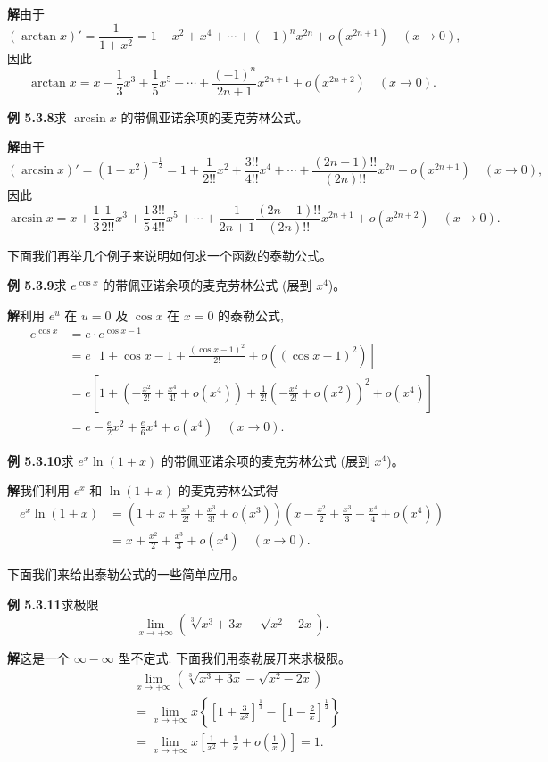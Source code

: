 \documentclass[UTF8, 12pt, fontset=fandol, oneside]{ctexart}
\begin{document}
\noindent\textbf{解}\quad 由于
\[
  (\arctan x)'=\frac1{1+x^2}=1-x^2+x^4+\cdots+(-1)^nx^{2n}+o(x^{2n+1})\quad (x\to0),
\]
因此
\[
  \arctan x=x-\frac13x^3+\frac15x^5+\cdots+\frac{(-1)^n}{2n+1}x^{2n+1}+o(x^{2n+2})\quad (x\to0).
\]

\noindent\textbf{例 5.3.8}\quad 求 $\arcsin x$ 的带佩亚诺余项的麦克劳林公式。

\noindent\textbf{解}\quad 由于
\[
  (\arcsin x)'=(1-x^2)^{-\frac12}
  =
  1+\frac1{2!!}x^2+\frac{3!!}{4!!}x^4+\cdots+
  \frac{(2n-1)!!}{(2n)!!}x^{2n}+o(x^{2n+1})
  \quad (x\to0),
\]
因此
\[
  \arcsin x
  =
  x+\frac13\frac1{2!!}x^3+\frac15\frac{3!!}{4!!}x^5+\cdots
  +\frac1{2n+1}\frac{(2n-1)!!}{(2n)!!}x^{2n+1}
  +o(x^{2n+2})
  \quad (x\to0).
\]

下面我们再举几个例子来说明如何求一个函数的泰勒公式。

\noindent\textbf{例 5.3.9}\quad 求 $e^{\cos x}$ 的带佩亚诺余项的麦克劳林公式 (展到 $x^4$)。

\noindent\textbf{解}\quad 利用 $e^u$ 在 $u=0$ 及 $\cos x$ 在 $x=0$ 的泰勒公式,
\[
\begin{aligned}
  e^{\cos x}
  &=
  e\cdot e^{\cos x-1} \\
  &=
  e\left[1+\cos x-1+\frac{(\cos x-1)^2}{2!}+o((\cos x-1)^2)\right] \\
  &=
  e\left[1+\left(-\frac{x^2}{2!}+\frac{x^4}{4!}+o(x^4)\right)
  +\frac1{2!}\left(-\frac{x^2}{2!}+o(x^2)\right)^2+o(x^4)\right] \\
  &=
  e-\frac e2x^2+\frac e6x^4+o(x^4)\quad (x\to0).
\end{aligned}
\]

\noindent\textbf{例 5.3.10}\quad 求 $e^x\ln(1+x)$ 的带佩亚诺余项的麦克劳林公式 (展到 $x^4$)。

\noindent\textbf{解}\quad 我们利用 $e^x$ 和 $\ln(1+x)$ 的麦克劳林公式得
\[
\begin{aligned}
  e^x\ln(1+x)
  &=
  \left(1+x+\frac{x^2}{2!}+\frac{x^3}{3!}+o(x^3)\right)
  \left(x-\frac{x^2}{2}+\frac{x^3}{3}-\frac{x^4}{4}+o(x^4)\right) \\
  &=
  x+\frac{x^2}{2}+\frac{x^3}{3}+o(x^4)\quad (x\to0).
\end{aligned}
\]

下面我们来给出泰勒公式的一些简单应用。

\noindent\textbf{例 5.3.11}\quad 求极限
\[
  \lim_{x\to+\infty}\left(\sqrt[3]{x^3+3x}-\sqrt{x^2-2x}\right).
\]

\noindent\textbf{解}\quad 这是一个 $\infty-\infty$ 型不定式. 下面我们用泰勒展开来求极限。
\[
\begin{aligned}
  &\lim_{x\to+\infty}\left(\sqrt[3]{x^3+3x}-\sqrt{x^2-2x}\right) \\
  &=
  \lim_{x\to+\infty}x
  \left\{
    \left[1+\frac3{x^2}\right]^{\frac13}
    -
    \left[1-\frac2x\right]^{\frac12}
  \right\} \\
  &=
  \lim_{x\to+\infty}x
  \left[
    \frac1{x^2}+\frac1x+o\left(\frac1x\right)
  \right]
  =
  1.
\end{aligned}
\]
\end{document}
